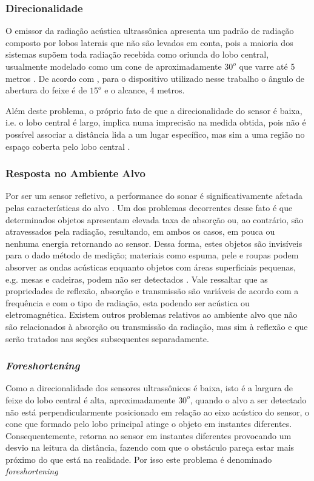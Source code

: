 \subsubsection{Direcionalidade}
O emissor da radiação acústica ultrassônica apresenta um padrão de radiação\cite{balanis,pozar} composto por lobos laterais\cite{balanis,pozar} que 
não são levados em conta, pois a maioria dos sistemas supõem toda radiação recebida como oriunda do lobo central\cite{balanis,pozar}, usualmente 
modelado como um cone de aproximadamente $30^o$ que varre até 5 metros \cite{murphy}. De acordo com \cite{HC-SR04}, para o dispositivo utilizado 
nesse trabalho o ângulo de abertura do feixe é de $15^o$ e o alcance, 4 metros.

Além deste problema, o próprio fato de que a direcionalidade do sensor é baixa, i.e. o lobo central é largo, implica numa 
imprecisão na medida obtida, pois não é possível associar a distância lida a um lugar específico, mas sim a uma região no espaço coberta pelo lobo 
central \cite{siegwart}.

\subsubsection{Resposta no Ambiente Alvo}
Por ser um sensor refletivo, a performance do sonar é significativamente afetada pelas características do alvo \cite{everett}.
Um dos problemas decorrentes desse fato é que determinados objetos apresentam elevada taxa de absorção ou, ao contrário, são atravessados pela 
radiação, resultando, em ambos os casos, em pouca ou nenhuma energia retornando ao sensor. Dessa forma, estes objetos são invisíveis para o dado 
método de medição; materiais como espuma, pele e roupas podem absorver as ondas acústicas \cite{siegwart} enquanto objetos com áreas superficiais 
pequenas, e.g. mesas e cadeiras, podem não ser detectados \cite{murphy}. Vale ressaltar que as propriedades de reflexão, absorção e transmissão 
são variáveis de acordo com a frequência e com o tipo de radiação, esta podendo ser acústica ou eletromagnética.
Existem outros problemas relativos ao ambiente alvo que não são relacionados à absorção ou transmissão da radiação, mas sim à reflexão e que serão 
tratados nas 
seções subsequentes separadamente.

\subsubsection{\textit{Foreshortening}}
Como a direcionalidade dos sensores ultrassônicos é baixa, isto é a largura de feixe do lobo central é alta, aproximadamente $30^o$, quando o alvo 
a ser detectado não está perpendicularmente posicionado em relação ao eixo acústico do sensor, o cone que formado pelo lobo principal atinge o objeto 
em instantes diferentes. Consequentemente, retorna ao sensor em instantes diferentes provocando um desvio na leitura da distância, fazendo com que o 
obstáculo pareça estar mais próximo do que está na realidade. Por isso este problema é denominado \textit{foreshortening}

